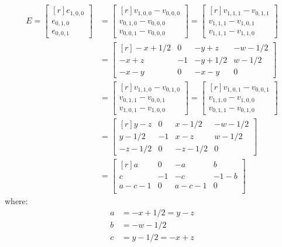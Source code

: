 \documentclass[12pt,titlepage]{article}
\numberwithin{equation}{section}
\begin{document}
\begin{align*}
E =
\begin{bmatrix*}[r]
e_{1,0,0} \\
e_{0,1,0} \\
e_{0,0,1}
\end{bmatrix*}
&=
\begin{bmatrix*}[r]
v_{1,0,0} - v_{0,0,0} \\
v_{0,1,0} - v_{0,0,0} \\
v_{0,0,1} - v_{0,0,0}
\end{bmatrix*}
= 
\begin{bmatrix*}[r]
v_{1,1,1} - v_{0,1,1} \\
v_{1,1,1} - v_{1,0,1} \\
v_{1,1,1} - v_{1,1,0}
\end{bmatrix*}
\\
&=  
\begin{bmatrix*}[r]
-x + 1/2 &  0 & -y +   z & -w - 1/2 \\
-x +   z & -1 & -y + 1/2 &  w - 1/2 \\
-x -   y &  0 & -x -   y &        0
\end{bmatrix*}
\\
&= 
\begin{bmatrix*}[r]
v_{1,1,0} - v_{0,1,0} \\
v_{0,1,1} - v_{0,0,1} \\
v_{1,0,1} - v_{1,0,0}
\end{bmatrix*}
= 
\begin{bmatrix*}[r]
v_{1,0,1} - v_{0,0,1} \\
v_{1,1,0} - v_{1,0,0} \\
v_{0,1,1} - v_{0,1,0}
\end{bmatrix*}
\\
&=  
\begin{bmatrix*}[r]
 y - z   &  0 &  x - 1/2 & -w - 1/2 \\
 y - 1/2 & -1 &  x - z   &  w - 1/2 \\
-z - 1/2 &  0 & -z - 1/2 &        0
\end{bmatrix*}
\\
&=  
\begin{bmatrix*}[r]
a     &  0 & -a     &    b \\
c     & -1 & -c     & -1-b \\
a-c-1 &  0 &  a-c-1 &    0 \\
\end{bmatrix*}
\end{align*}
where:
\begin{align*}
a &= -x+1/2 = y-z \\
b &= -w-1/2       \\
c &= y-1/2 = -x+z
\end{align*}
\end{document}
